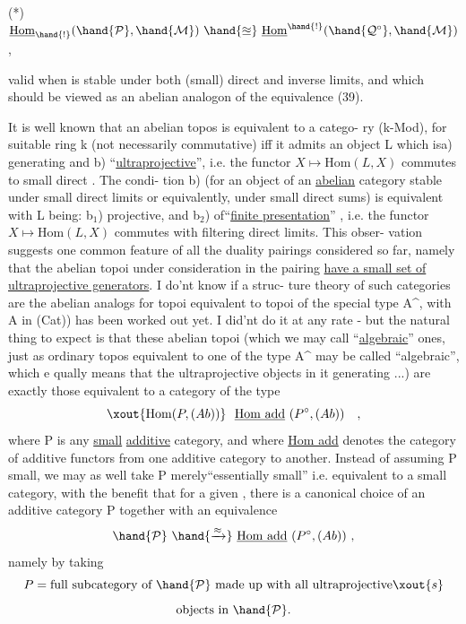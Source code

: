
(*) \qquad $\underline{\mathrm{Hom}}_{\hand{!}}(\hand{\mathcal{P}},\hand{\mathcal{M}})\ \hand{\approxeq}\ \underline{\mathrm{Hom}}^{\hand{!}}(\hand{\mathcal{Q}^{\circ}},\hand{\mathcal{M}})$ \qquad ,

valid when   is stable under both (small) direct and inverse limits,
and which should be viewed as an abelian analogon of the equivalence (39).

 It is well known that an abelian topos  is equivalent to a catego-%
ry (k-Mod), for suitable ring k (not necessarily commutative) iff it 
admits an object L which is\hand{:}a) generating\hand{,} and b) ``\uline{ultraprojective}'',
i.e. the functor $X\mapsto \mathrm{Hom}(L,X)$ commutes to small direct . The condi-%
tion b) (for an object of an \uline{abelian} category stable under small direct
limits or equivalently, under small direct sums) is equivalent with L
being: b$_1$) projective, and b$_2$) of``\uline{finite presentation}'' , i.e. the
functor $X\mapsto \mathrm{Hom}(L,X)$ commutes with  filtering direct limits. This obser-%
vation suggests one common feature of all the  duality pairings considered
so far, namely that the abelian topoi under consideration in the pairing
\uline{have a small set of ultraprojective generators}. I do'nt know if a struc-%
ture theory of such categories\hand{,} are the abelian analogs  for topoi
equivalent to topoi of the special type A\^{}, \hand{(}with A in (Cat)) has been
worked out\xout{,} yet. I did'nt do it at any rate - but the natural thing to
expect is that these abelian topoi (which we may call ``\uline{algebraic}'' ones,
just as ordinary topos equivalent to one of the type A\^{} may be called
``algebraic'', which e qually means that the  ultraprojective objects in it
 generating ...) are exactly those equivalent to a category of the type
\[ \xout{\mathrm{Hom}(P,(Ab))}\ \ \underline{\mathrm{Hom\ add}}\ (P^{\circ}, (Ab)) \quad , \]
where P is any \uline{small} \uline{additive} category, and where \uline{Hom add} denotes
the category of additive functors from one additive category to another.
Instead of assuming P small, we may as well take P merely``essentially
small'' i.e. equivalent to a small category, with the benefit that for
a given  , there is a canonical choice of an additive category P
together with an equivalence
\[ \hand{\mathcal{P}}\ \hand{\xrightarrow{\approx}}\ \underline{\mathrm{Hom\ add}}\ (P^{\circ}, (Ab)) \ , \]
namely by taking
\[ P = \text{full subcategory of } \hand{\mathcal{P}} \text{ made up with all ultraprojective}\xout{s} \]
\[ \text{objects in } \hand{\mathcal{P}}. \]

